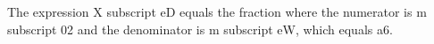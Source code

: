 The expression X subscript eD equals the fraction where the numerator is m subscript 02 and the denominator is m subscript eW, which equals a6.